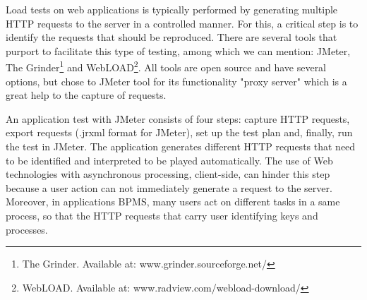 \documentclass[runningheads,a4paper]{llncs}
\begin{document}
Load tests on web applications is typically performed by generating multiple HTTP requests to the server in a controlled manner. For this, a critical step is to identify the requests that should be reproduced. There are several tools that purport to facilitate this type of testing, among which we can mention: JMeter, The Grinder\footnote{The Grinder. Available at: www.grinder.sourceforge.net/} and WebLOAD\footnote{WebLOAD. Available at: www.radview.com/webload-download/}. All tools are open source and have several options, but chose to JMeter tool for its functionality "proxy server" which is a great help to the capture of requests.

An application test with JMeter consists of four steps: capture HTTP requests, export requests (.jrxml format for JMeter), set up the test plan and, finally, run the test in JMeter. The application generates different HTTP requests that need to be identified and interpreted to be played automatically. The use of Web technologies with asynchronous processing, client-side, can hinder this step because a user action can not immediately generate a request to the server. Moreover, in applications BPMS, many users act on different tasks in a same process, so that the HTTP requests that carry user identifying keys and processes.
\end{document}
